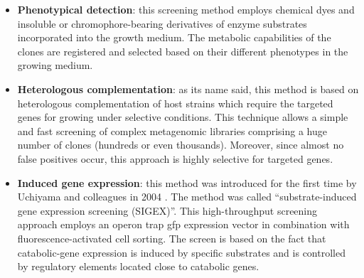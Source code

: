 \begin{itemize}
\item \textbf{Phenotypical detection}: this screening method employs chemical dyes and insoluble or chromophore-bearing derivatives of enzyme substrates incorporated into the growth medium. The metabolic capabilities of the clones are registered and selected based on their different phenotypes in the growing medium.

\item \textbf{Heterologous complementation}: as its name said, this method is based on heterologous complementation of host strains which require the targeted genes for growing under selective conditions. This technique allows a simple and fast screening of complex metagenomic libraries comprising a huge number of clones (hundreds or even thousands). Moreover, since almost no false positives occur, this approach is highly selective for targeted genes.

\item \textbf{Induced gene expression}: this method was introduced for the first time by Uchiyama and colleagues in 2004 \cite{uchiyama2004substrate}. The method was called ``substrate-induced gene expression screening (SIGEX)''. This high-throughput screening approach employs an operon trap gfp expression vector in combination with fluorescence-activated cell sorting. The screen is based on the fact that catabolic-gene expression is induced by specific substrates and is controlled by regulatory elements located close to catabolic genes.

\end{itemize}

